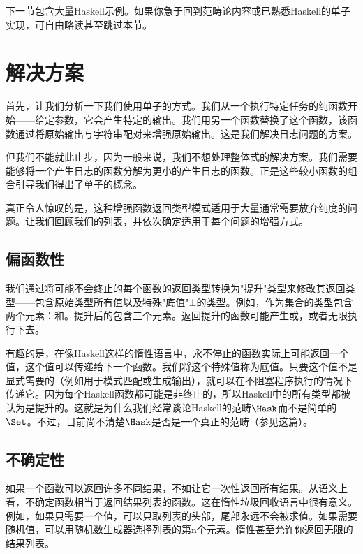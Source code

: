下一节包含大量Haskell示例。如果你急于回到范畴论内容或已熟悉Haskell的单子实现，可自由略读甚至跳过本节。

\section{解决方案}

首先，让我们分析一下我们使用单子的方式。我们从一个执行特定任务的纯函数开始——给定参数，它会产生特定的输出。我们用另一个函数替换了这个函数，该函数通过将原始输出与字符串配对来增强原始输出。这是我们解决日志问题的方案。

但我们不能就此止步，因为一般来说，我们不想处理整体式的解决方案。我们需要能够将一个产生日志的函数分解为更小的产生日志的函数。正是这些较小函数的组合引导我们得出了单子的概念。

真正令人惊叹的是，这种增强函数返回类型模式适用于大量通常需要放弃纯度的问题。让我们回顾我们的列表，并依次确定适用于每个问题的增强方式。

\subsection{偏函数性}

我们通过将可能不会终止的每个函数的返回类型转换为"提升"类型来修改其返回类型——包含原始类型所有值以及特殊"底值"$\bot$的类型。例如，作为集合的类型包含两个元素：和。提升后的包含三个元素。返回提升的函数可能产生或，或者无限执行下去。

有趣的是，在像Haskell这样的惰性语言中，永不停止的函数实际上可能返回一个值，这个值可以传递给下一个函数。我们将这个特殊值称为底值。只要这个值不是显式需要的（例如用于模式匹配或生成输出），就可以在不阻塞程序执行的情况下传递它。因为每个Haskell函数都可能是非终止的，所以Haskell中的所有类型都被认为是提升的。这就是为什么我们经常谈论Haskell的范畴$\Hask$而不是简单的$\Set$。不过，目前尚不清楚$\Hask$是否是一个真正的范畴（参见这篇）。

\subsection{不确定性}

如果一个函数可以返回许多不同结果，不如让它一次性返回所有结果。从语义上看，不确定函数相当于返回结果列表的函数。这在惰性垃圾回收语言中很有意义。例如，如果只需要一个值，可以只取列表的头部，尾部永远不会被求值。如果需要随机值，可以用随机数生成器选择列表的第n个元素。惰性甚至允许你返回无限的结果列表。

